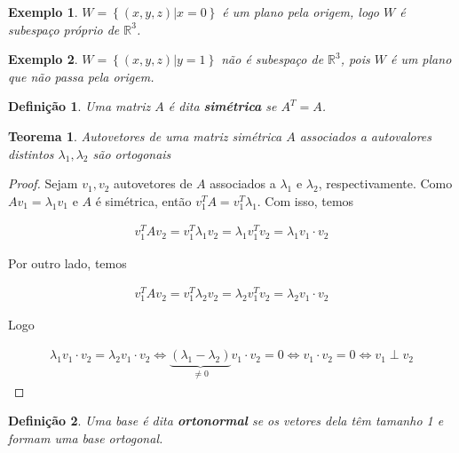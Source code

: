 \documentclass{article}
\newtheorem{theorem}{Teorema}[section]
\newtheorem*{definition}{Definição}
\newtheorem*{example}{Exemplo}
\begin{document}
\begin{example}
	$W = \left\{(x, y, z)|x=0\right\}$ é um plano pela origem, logo $W$ é subespaço próprio de $\mathbb{R}^3$.
\end{example}

\begin{example}
	$W = \left\{(x,y,z)|y=1\right\}$ não é subespaço de $\mathbb{R}^3$, pois $W$ é um plano que não passa pela origem.
\end{example}

\begin{definition}
	Uma matriz $A$ é dita \textbf{simétrica} se $A^T = A$.
\end{definition}

\begin{theorem}
	Autovetores de uma matriz simétrica $A$ associados a autovalores distintos $\lambda_1, \lambda_2$ são ortogonais
\end{theorem}

\begin{proof}
	Sejam $v_1, v_2$ autovetores de $A$ associados a $\lambda_1$ e $\lambda_2$, respectivamente. Como $Av_1 = \lambda_1v_1$ e $A$ é simétrica, então $v_1^TA = v_1^T\lambda_1$. Com isso, temos
	
	\begin{align*}
	v_1^TAv_2 = v_1^T\lambda_1v_2 = \lambda_1v_1^Tv_2 = \lambda_1v_1\cdot v_2
	\end{align*}
	
	\par\vspace{0.3cm} Por outro lado, temos
	
	\begin{align*}
	v_1^TAv_2 = v_1^T\lambda_2v_2 = \lambda_2v_1^Tv_2 = \lambda_2v_1\cdot v_2
	\end{align*}
	
	\par\vspace{0.3cm} Logo
	
	\begin{align*}
	\lambda_1v_1\cdot v_2 = \lambda_2v_1\cdot v_2 \Leftrightarrow \underbrace{(\lambda_1 - \lambda_2)}_{\neq 0}v_1\cdot v_2 = 0 \Leftrightarrow v_1\cdot v_2 = 0 \Leftrightarrow v_1\perp v_2
	\end{align*}
	 
\end{proof}

\begin{definition}
	Uma base é dita \textbf{ortonormal} se os vetores dela têm tamanho 1 e formam uma base ortogonal.
\end{definition}
\end{document}
